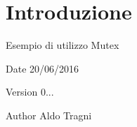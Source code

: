 \hypertarget{index_intro}{}\section{Introduzione}\label{index_intro}
Esempio di utilizzo Mutex

\begin{DoxyDate}{Date}
20/06/2016 
\end{DoxyDate}
\begin{DoxyVersion}{Version}
0... 
\end{DoxyVersion}
\begin{DoxyAuthor}{Author}
Aldo Tragni 
\end{DoxyAuthor}
